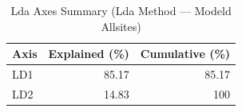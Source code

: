 \begin{table}[htbp]
  \centering
  \caption{Lda Axes Summary (Lda Method — Modeld Allsites)}
  \label{tab:LDA_Method_ModelD_AllSites_tables_lda_axes_summary}
  \begin{tabular}{lrr}
    \toprule
    Axis & Explained (\%) & Cumulative (\%) \\
    \midrule
    LD1 & 85.17 & 85.17 \\
    LD2 & 14.83 & 100 \\
    \bottomrule
  \end{tabular}
\end{table}
